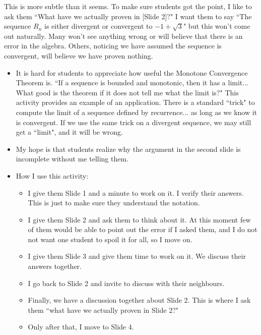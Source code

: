 \documentclass[11pt]{article}
\newcommand{\nl}{\hfill \vspace{-1.1\baselineskip}} %
\begin{document}
\begin{warning}
	This is more subtle than it seems.   To make sure students got the point, I like to ask them ``What have we actually proven in [Slide 2]?"  I want them to say ``The sequence $R_n$ is either divergent or convergent to $-1+\sqrt{3}$" but this won't come out naturally.  Many won't see anything wrong or will believe that there is an error in the algebra.  Others, noticing we have assumed the sequence is convergent, will believe we have proven nothing.
\end{warning}


\begin{comments}
\nl
	\begin{itemize}
		\item  It is hard for students to appreciate how useful the Monotone Convergence Theorem is.  ``If a sequence is bounded and monotonic, then it has a limit... What good is the theorem if it does not tell me what the limit is?"   This activity provides an example of an application.  There is a standard ``trick" to compute the limit of a sequence defined by recurrence... as long as we know it is convergent.  If we use the same trick on a divergent sequence, we may still get a ``limit", and it will be wrong.
		\item  My hope is that students realize why the argument in the second slide is incomplete without me telling them.
		\item How I use this activity:
			\begin{itemize}
				\item  I give them Slide 1 and a minute to work on it.  I verify their answers.  This is just to make sure they understand the notation.
				\item I give them Slide 2 and ask them to think about it.  At this moment few of them would be able to point out the error if I asked them, and I do not not want one student to spoil it for all, so I  move on.
				\item I give them Slide 3 and give them time to work on it.  We discuss their answers together.
				\item I go back to Slide 2 and invite to discuss with their neighbours.
				\item Finally, we have a discussion together about Slide 2.  This is where I ask them ``what have we actually proven in Slide 2?"
				\item Only after that, I move to Slide 4.
			\end{itemize}
	\end{itemize}
\end{comments}
\end{document}
